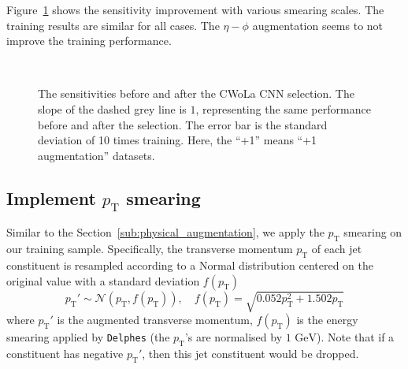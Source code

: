 \documentclass[12pt]{article}
\begin{document}
		Figure~\ref{fig:sensitivity_improvement_aug_1_smearing_scale} shows the sensitivity improvement with various smearing scales. The training results are similar for all cases. The $\eta-\phi$ augmentation seems to not improve the training performance.
		\begin{figure}[htpb]
			\centering
			 \\
			\caption{The sensitivities before and after the CWoLa CNN selection. The slope of the dashed grey line is $1$, representing the same performance before and after the selection. The error bar is the standard deviation of 10 times training. Here, the ``+1'' means ``+1 augmentation'' datasets.}
			\label{fig:sensitivity_improvement_aug_1_smearing_scale}
		\end{figure}
	\subsection{Implement \texorpdfstring{$p_{\mathrm{T}}$}{pT} smearing}%
	\label{sub:implement_pt_smearing}
		Similar to the Section~\ref{sub:physical_augmentation}, we apply the $p_{\text{T}}$ smearing on our training sample. Specifically, the transverse momentum $p_{\text{T}}$ of each jet constituent is resampled according to a Normal distribution centered on the original value with a standard deviation $f(p_{\text{T}})$
		\begin{equation}
			p_{\text{T}}' \sim \mathcal{N}\left( p_{\text{T}}, f(p_{\text{T}}) \right), \quad f(p_{\text{T}}) = \sqrt{0.052 p_{\text{T}}^2 + 1.502p_{\text{T}}}
		\end{equation}
		where $p_{\text{T}}'$ is the augmented transverse momentum, $f\left( p_\text{T} \right) $ is the energy smearing applied by \verb|Delphes| (the $p_{\text{T}}$'s are normalised by $\text{1 GeV}$). Note that if a constituent has negative $p_{\text{T}}'$, then this jet constituent would be dropped.
\end{document}
